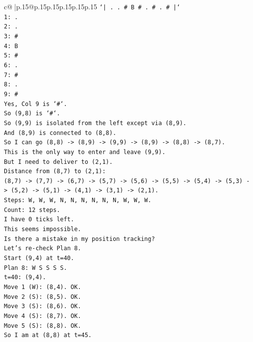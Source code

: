 \documentclass{article}
\begin{document}
{\begin{supertabular}{c@{$\;$}|p{.15\linewidth}@{}p{.15\linewidth}p{.15\linewidth}p{.15\linewidth}p{.15\linewidth}p{.15\linewidth}}
{{{\texttt{`| . . \# B \# . \# . \# |`} \\
\texttt{1: .} \\
\texttt{2: .} \\
\texttt{3: \#} \\
\texttt{4: B} \\
\texttt{5: \#} \\
\texttt{6: .} \\
\texttt{7: \#} \\
\texttt{8: .} \\
\texttt{9: \#} \\
\texttt{Yes, Col 9 is `\#`.} \\
\texttt{So (9,8) is `\#`.} \\
\texttt{So (9,9) is isolated from the left except via (8,9).} \\
\texttt{And (8,9) is connected to (8,8).} \\
\texttt{So I can go (8,8) {-}> (8,9) {-}> (9,9) {-}> (8,9) {-}> (8,8) {-}> (8,7).} \\
\texttt{This is the only way to enter and leave (9,9).} \\
\texttt{But I need to deliver to (2,1).} \\
\texttt{Distance from (8,7) to (2,1):} \\
\texttt{(8,7) {-}> (7,7) {-}> (6,7) {-}> (5,7) {-}> (5,6) {-}> (5,5) {-}> (5,4) {-}> (5,3) {-}> (5,2) {-}> (5,1) {-}> (4,1) {-}> (3,1) {-}> (2,1).} \\
\texttt{Steps: W, W, W, N, N, N, N, N, N, W, W, W.} \\
\texttt{Count: 12 steps.} \\
\texttt{I have 0 ticks left.} \\
\texttt{This seems impossible.} \\
\texttt{Is there a mistake in my position tracking?} \\
\texttt{Let's re{-}check Plan 8.} \\
\texttt{Start (9,4) at t=40.} \\
\texttt{Plan 8: W S S S S.} \\
\texttt{t=40: (9,4).} \\
\texttt{Move 1 (W): (8,4). OK.} \\
\texttt{Move 2 (S): (8,5). OK.} \\
\texttt{Move 3 (S): (8,6). OK.} \\
\texttt{Move 4 (S): (8,7). OK.} \\
\texttt{Move 5 (S): (8,8). OK.} \\
\texttt{So I am at (8,8) at t=45.} \\
}}}
\end{supertabular}}
\end{document}
